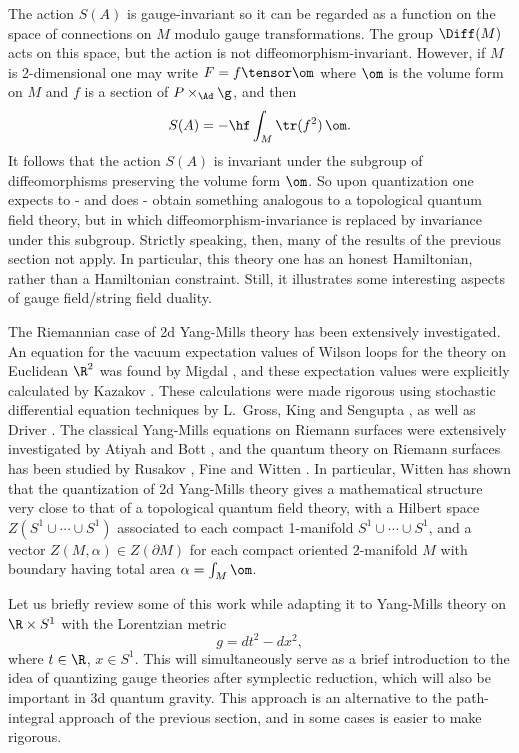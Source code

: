 The action $S(A)$ is gauge-invariant so it can be regarded as a function on
the space of connections on $M$ modulo gauge transformations.  The group
$\Diff(M)$ acts on this space, but the action is not
diffeomorphism-invariant.  However, if $M$ is 2-dimensional one may write
$F = f \tensor \om$ where $\om$ is the volume form on $M$ and $f$ is a
section of $P \times_{\Ad} \g$, and then
\[          S(A) = -\hf \int_M \tr(f^2) \,\om.  \]
It follows that the action $S(A)$ is invariant under the subgroup of
diffeomorphisms preserving the volume form $\om$.  So upon quantization one
expects to - and does - obtain something analogous to a topological quantum
field theory, but in which diffeomorphism-invariance is replaced by
invariance under this subgroup. Strictly speaking, then, many of the
results of the previous section  not apply.  In particular, this theory one
has an honest Hamiltonian, rather than a Hamiltonian constraint.  Still, it
illustrates some interesting aspects of gauge field/string field duality.

The Riemannian case of 2d Yang-Mills theory has been extensively
investigated.    An equation for the vacuum expectation values of Wilson
loops for the theory on Euclidean $\R^2$  was found by Migdal
\cite{Migdal}, and these expectation values were explicitly calculated by
Kazakov \cite{Kazakov}.  These calculations were made rigorous using
stochastic differential equation techniques by L.\ Gross, King and Sengupta
\cite{GKS}, as well as Driver \cite{Driver}.  The classical Yang-Mills
equations on Riemann surfaces were extensively investigated by Atiyah and Bott
\cite{AB}, and the quantum theory on Riemann surfaces has been studied by
Rusakov \cite{Rusakov}, Fine \cite{Fine} and Witten \cite{Witten}.    In
particular, Witten has shown that the quantization of 2d Yang-Mills theory
gives a mathematical structure very close to that of a topological quantum
field theory, with a Hilbert space $Z(S^1 \cup \cdots \cup S^1)$ associated
to each compact 1-manifold $S^1 \cup \cdots \cup S^1$, and a vector
$Z(M,\alpha) \in Z(\partial M)$ for each compact oriented 2-manifold $M$
with boundary having total area $\alpha = \int_M \om$.

Let us briefly review some of this work while adapting it to Yang-Mills theory
on $\R \times S^1$ with the Lorentzian metric
\[                 g = dt^2 - dx^2,  \]
where $t \in \R$, $x \in S^1$.  This will simultaneously serve as a brief
introduction to the idea of quantizing gauge theories after symplectic
reduction, which will also be important in 3d quantum gravity.  This
approach is an alternative to the path-integral approach of the previous
section, and in some cases is easier to make rigorous.

